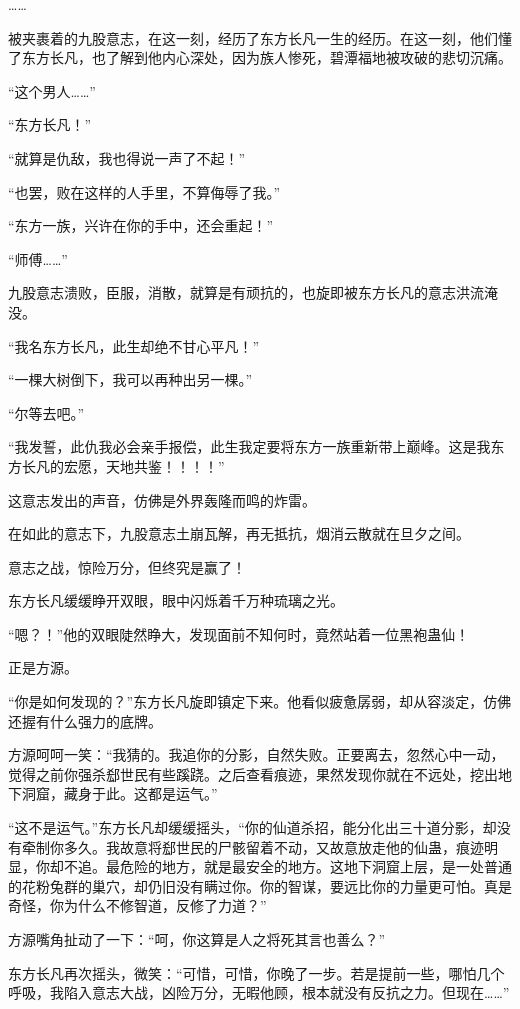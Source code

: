 \begin{this_body}
……

被夹裹着的九股意志，在这一刻，经历了东方长凡一生的经历。在这一刻，他们懂了东方长凡，也了解到他内心深处，因为族人惨死，碧潭福地被攻破的悲切沉痛。

“这个男人……”

“东方长凡！”

“就算是仇敌，我也得说一声了不起！”

“也罢，败在这样的人手里，不算侮辱了我。”

“东方一族，兴许在你的手中，还会重起！”

“师傅……”

九股意志溃败，臣服，消散，就算是有顽抗的，也旋即被东方长凡的意志洪流淹没。

“我名东方长凡，此生却绝不甘心平凡！”

“一棵大树倒下，我可以再种出另一棵。”

“尔等去吧。”

“我发誓，此仇我必会亲手报偿，此生我定要将东方一族重新带上巅峰。这是我东方长凡的宏愿，天地共鉴！！！！”

这意志发出的声音，仿佛是外界轰隆而鸣的炸雷。

在如此的意志下，九股意志土崩瓦解，再无抵抗，烟消云散就在旦夕之间。

意志之战，惊险万分，但终究是赢了！

东方长凡缓缓睁开双眼，眼中闪烁着千万种琉璃之光。

“嗯？！”他的双眼陡然睁大，发现面前不知何时，竟然站着一位黑袍蛊仙！

正是方源。

“你是如何发现的？”东方长凡旋即镇定下来。他看似疲惫孱弱，却从容淡定，仿佛还握有什么强力的底牌。

方源呵呵一笑：“我猜的。我追你的分影，自然失败。正要离去，忽然心中一动，觉得之前你强杀郄世民有些蹊跷。之后查看痕迹，果然发现你就在不远处，挖出地下洞窟，藏身于此。这都是运气。”

“这不是运气。”东方长凡却缓缓摇头，“你的仙道杀招，能分化出三十道分影，却没有牵制你多久。我故意将郄世民的尸骸留着不动，又故意放走他的仙蛊，痕迹明显，你却不追。最危险的地方，就是最安全的地方。这地下洞窟上层，是一处普通的花粉兔群的巢穴，却仍旧没有瞒过你。你的智谋，要远比你的力量更可怕。真是奇怪，你为什么不修智道，反修了力道？”

方源嘴角扯动了一下：“呵，你这算是人之将死其言也善么？”

东方长凡再次摇头，微笑：“可惜，可惜，你晚了一步。若是提前一些，哪怕几个呼吸，我陷入意志大战，凶险万分，无暇他顾，根本就没有反抗之力。但现在……”


\end{this_body}
